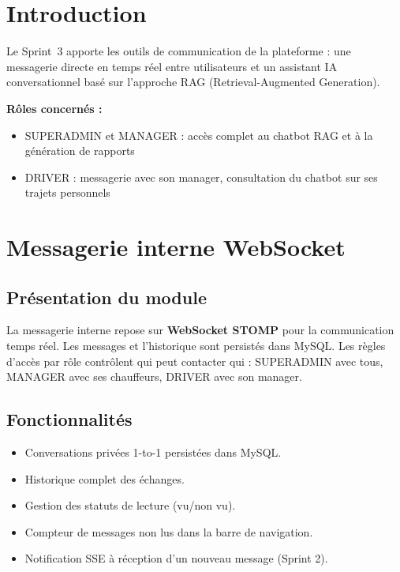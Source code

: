 \documentclass[12pt,a4paper]{report}
\begin{document}
\section{Introduction}
\label{sec:ch5-introduction}

Le Sprint~3 apporte les outils de communication de la plateforme :
une messagerie directe en temps réel entre utilisateurs et un assistant
IA conversationnel basé sur l'approche RAG (Retrieval-Augmented Generation).

\textbf{Rôles concernés :}
\begin{itemize}
    \item SUPERADMIN et MANAGER : accès complet au chatbot RAG et à la génération de rapports
    \item DRIVER : messagerie avec son manager, consultation du chatbot sur ses trajets personnels
\end{itemize}

\section{Messagerie interne WebSocket}
\label{sec:ch5-messenger}

\subsection{Présentation du module}

La messagerie interne repose sur \textbf{WebSocket STOMP} pour la
communication temps réel. Les messages et l'historique sont persistés
dans MySQL. Les règles d'accès par rôle contrôlent qui peut contacter qui :
SUPERADMIN avec tous, MANAGER avec ses chauffeurs, DRIVER avec son manager.

\subsection{Fonctionnalités}

\begin{itemize}
  \item Conversations privées 1-to-1 persistées dans MySQL.
  \item Historique complet des échanges.
  \item Gestion des statuts de lecture (vu/non vu).
  \item Compteur de messages non lus dans la barre de navigation.
  \item Notification SSE à réception d'un nouveau message (Sprint 2).
\end{itemize}
\end{document}
